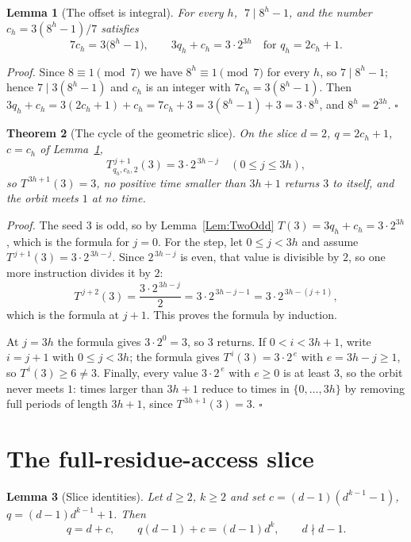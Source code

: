 \documentclass[11pt,letterpaper]{article}
\newtheorem{theorem}{Theorem}
\newtheorem{lemma}[theorem]{Lemma}
\newenvironment{proof}{\noindent\textit{Proof.}}{\hfill\(\square\)}
\begin{document}
\begin{lemma}[The offset is integral]\label{Lem:GeoOffset}
For every \(h\), \(\;7\mid 8^{h}-1\), and the number
\(c_h=3(8^{h}-1)/7\) satisfies
\[
 7c_h=3\bigl(8^{h}-1\bigr),\qquad
 3q_h+c_h=3\cdot2^{3h}\quad\text{for } q_h=2c_h+1 .
\]
\end{lemma}

\begin{proof}
Since \(8\equiv1\pmod7\) we have \(8^{h}\equiv1\pmod7\) for every \(h\), so
\(7\mid8^{h}-1\); hence \(7\mid3(8^{h}-1)\) and \(c_h\) is an integer with
\(7c_h=3(8^{h}-1)\). Then
\(3q_h+c_h=3(2c_h+1)+c_h=7c_h+3=3(8^{h}-1)+3=3\cdot8^{h}\), and
\(8^{h}=2^{3h}\).
\end{proof}

\begin{theorem}[The cycle of the geometric slice]\label{Thm:GeoLoop}
On the slice \(d=2\), \(q=2c_h+1\), \(c=c_h\) of Lemma~\ref{Lem:GeoOffset},
\[
 T_{q_h,c_h,2}^{\,j+1}(3)=3\cdot2^{\,3h-j}\quad(0\le j\le3h),
\]
so \(T^{\,3h+1}(3)=3\), no positive time smaller than \(3h+1\) returns \(3\)
to itself, and the orbit meets \(1\) at no time.
\end{theorem}

\begin{proof}
The seed \(3\) is odd, so by Lemma~\ref{Lem:TwoOdd}
\(T(3)=3q_h+c_h=3\cdot2^{3h}\), which is the formula for \(j=0\). For the
step, let \(0\le j<3h\) and assume \(T^{\,j+1}(3)=3\cdot2^{\,3h-j}\). Since
\(2^{\,3h-j}\) is even, that value is divisible by \(2\), so one more
instruction divides it by \(2\):
\[
 T^{\,j+2}(3)=\frac{3\cdot2^{\,3h-j}}2=3\cdot2^{\,3h-j-1}
 =3\cdot2^{\,3h-(j+1)},
\]
which is the formula at \(j+1\). This proves the formula by induction.

At \(j=3h\) the formula gives \(3\cdot2^{0}=3\), so \(3\) returns. If
\(0<i<3h+1\), write \(i=j+1\) with \(0\le j<3h\); the formula gives
\(T^{\,i}(3)=3\cdot2^{\,e}\) with \(e=3h-j\ge1\), so
\(T^{\,i}(3)\ge6\ne3\). Finally, every value \(3\cdot2^{\,e}\) with \(e\ge0\)
is at least \(3\), so the orbit never meets \(1\): times larger than
\(3h+1\) reduce to times in \(\{0,\dots,3h\}\) by removing full periods of
length \(3h+1\), since \(T^{\,3h+1}(3)=3\).
\end{proof}

\section{The full-residue-access slice}

\begin{lemma}[Slice identities]\label{Lem:FullIdentity}
Let \(d\ge2\), \(k\ge2\) and set \(c=(d-1)(d^{k-1}-1)\),
\(q=(d-1)d^{k-1}+1\). Then
\[
 q=d+c,\qquad q(d-1)+c=(d-1)d^{k},\qquad d\nmid d-1 .
\]
\end{lemma}
\end{document}
